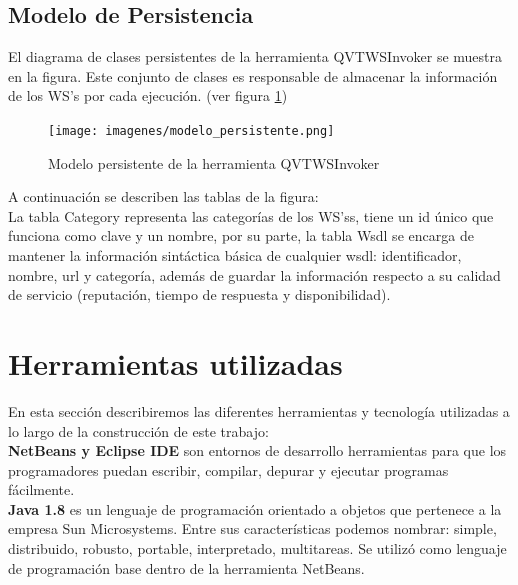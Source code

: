   \subsection{Modelo de Persistencia}
  
  El diagrama de clases persistentes de la herramienta QVTWSInvoker se muestra en la figura. Este conjunto de clases es responsable de almacenar la información de los WS's por cada ejecución. (ver figura \ref{fig:Modelo persistente de la herramienta QVTWSInvoker})\\
  
  \begin{figure}[!h] 
  	\begin{center}
  		\texttt{[image: imagenes/modelo\_persistente.png]}
  	\end{center}
  	\caption{Modelo persistente de la herramienta QVTWSInvoker}
  	\label{fig:Modelo persistente de la herramienta QVTWSInvoker}
  \end{figure}
  
  A continuación se describen las tablas de la figura:\\
  
  La tabla Category representa las categorías de los WS'ss, tiene un id único que funciona como clave y un nombre, por su parte, la tabla Wsdl se encarga de mantener la información sintáctica básica de cualquier wsdl: identificador, nombre, url y categoría, además de guardar la información respecto a su calidad de servicio (reputación, tiempo de respuesta y disponibilidad).\\
  
  
\section{Herramientas utilizadas}
  
En esta sección describiremos las diferentes herramientas y tecnología utilizadas a lo largo de la construcción de este trabajo:\\

\textbf{NetBeans y Eclipse IDE} son entornos de desarrollo herramientas para que los programadores puedan escribir, compilar, depurar y ejecutar programas fácilmente.\\ 		

\textbf{Java 1.8} es un lenguaje de programación orientado a objetos que pertenece a la empresa Sun Microsystems. Entre sus características podemos nombrar: simple, distribuido, robusto, portable, interpretado, multitareas. Se utilizó como lenguaje de programación base dentro de la herramienta NetBeans.\\

